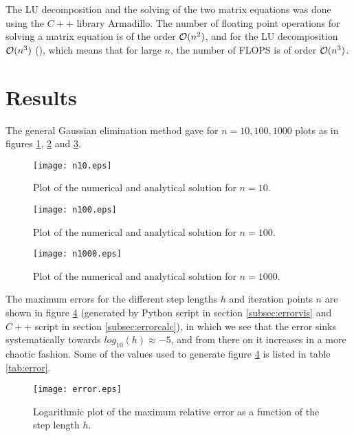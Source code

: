 \documentclass[norsk,a4paper,12pt]{article}
\begin{document}
The LU decomposition and the solving of the two matrix equations was done using the $C++$ library Armadillo. The number of floating point operations for solving a matrix equation is of the order ${\cal O}(n^2)$, and for the LU decomposition ${\cal O}(n^3)$ (\cite[p. 173]{MHJ15}), which means that for large $n$, the number of FLOPS is of order ${\cal O}(n^3)$. 
\section{Results}
The general Gaussian elimination method gave for $n=10,100,1000$ plots as in figures \ref{fig:n=10}, \ref{fig:n=100} and \ref{fig:n=1000}.
\begin{figure}[h!]
\begin{center}
\texttt{[image: n10.eps]}
\caption{Plot of the numerical and analytical solution for $n=10$.}
\label{fig:n=10}
\end{center}
\end{figure}
\begin{figure}[h!]
\begin{center}
\texttt{[image: n100.eps]}
\caption{Plot of the numerical and analytical solution for $n=100$.}
\label{fig:n=100}
\end{center}
\end{figure}
\begin{figure}[h!]
\begin{center}
\texttt{[image: n1000.eps]}
\caption{Plot of the numerical and analytical solution for $n=1000$.}
\label{fig:n=1000}
\end{center}
\end{figure}
The maximum errors for the different step lengths $h$ and iteration points $n$ are shown in figure \ref{fig:error} (generated by Python script in section \ref{subsec:errorvis} and $C++$ script in section \ref{subsec:errorcalc}), in which we see that the error sinks systematically towards $log_{10}(h)\approx -5$, and from there on it increases in a more chaotic fashion. Some of the values used to generate figure \ref{fig:error} is listed in table \ref{tab:error}.
\begin{figure}[h!]
\begin{center}
\texttt{[image: error.eps]}
\caption{Logarithmic plot of the maximum relative error as a function of the step length $h$.}
\label{fig:error}
\end{center}
\end{figure}
\end{document}

